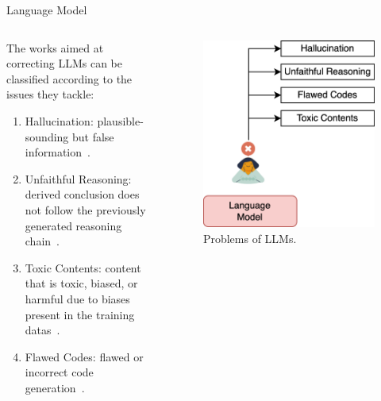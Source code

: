 \begin{frame}{Language Model}
    \begin{columns}[T]
        \begin{column}{0.70\textwidth}
            The works aimed at correcting LLMs can be classified according to the issues they tackle:
            \begin{enumerate}
                \item Hallucination: plausible-sounding but false information~\cite{gao2023rarr, zhang2023language}.

                \item Unfaithful Reasoning: derived conclusion does not follow the previously generated reasoning chain~\cite{he2022rethinking, pan2023logiclm}.

                \item Toxic Contents: content that is toxic, biased, or harmful due to biases present in the training datas~\cite{lu2022quark, gou2023critic}.

                \item Flawed Codes: flawed or incorrect code generation~\cite{chen2023teaching, olausson2023selfrepair}.
            \end{enumerate}
        \end{column}
        \begin{column}{0.30\textwidth}
            \begin{figure}[!htb]
                \centering
                \includegraphics[width=1\textwidth]{img/language_model}
                \captionsetup{font=small,labelformat=empty}
                \caption{Problems of LLMs.}
            \end{figure}
        \end{column}
    \end{columns}
\end{frame}

